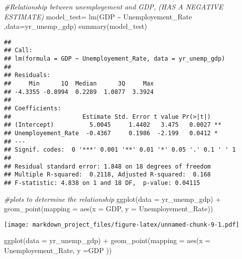 \documentclass[
]{article}
\newenvironment{Shaded}{\begin{snugshade}}{\end{snugshade}}
\newcommand{\AttributeTok}[1]{\textcolor[rgb]{0.77,0.63,0.00}{#1}}
\newcommand{\CommentTok}[1]{\textcolor[rgb]{0.56,0.35,0.01}{\textit{#1}}}
\newcommand{\FunctionTok}[1]{\textcolor[rgb]{0.00,0.00,0.00}{#1}}
\newcommand{\NormalTok}[1]{#1}
\newcommand{\OtherTok}[1]{\textcolor[rgb]{0.56,0.35,0.01}{#1}}
\newcommand{\SpecialCharTok}[1]{\textcolor[rgb]{0.00,0.00,0.00}{#1}}
\begin{document}
\begin{Shaded}
\begin{Highlighting}[]
\CommentTok{\#Relationship between unemployement and GDP, (HAS A NEGATIVE ESTIMATE)}
\NormalTok{model\_test}\OtherTok{=} \FunctionTok{lm}\NormalTok{(GDP }\SpecialCharTok{\textasciitilde{}}\NormalTok{ Unemployement\_Rate ,}\AttributeTok{data=}\NormalTok{yr\_unemp\_gdp)}
\FunctionTok{summary}\NormalTok{(model\_test)}
\end{Highlighting}
\end{Shaded}

\begin{verbatim}
## 
## Call:
## lm(formula = GDP ~ Unemployement_Rate, data = yr_unemp_gdp)
## 
## Residuals:
##     Min      1Q  Median      3Q     Max 
## -4.3355 -0.8994  0.2289  1.0877  3.3924 
## 
## Coefficients:
##                    Estimate Std. Error t value Pr(>|t|)   
## (Intercept)          5.0045     1.4402   3.475   0.0027 **
## Unemployement_Rate  -0.4367     0.1986  -2.199   0.0412 * 
## ---
## Signif. codes:  0 '***' 0.001 '**' 0.01 '*' 0.05 '.' 0.1 ' ' 1
## 
## Residual standard error: 1.848 on 18 degrees of freedom
## Multiple R-squared:  0.2118, Adjusted R-squared:  0.168 
## F-statistic: 4.838 on 1 and 18 DF,  p-value: 0.04115
\end{verbatim}

\begin{Shaded}
\begin{Highlighting}[]
\CommentTok{\#plots to determine the relationship}
\FunctionTok{ggplot}\NormalTok{(}\AttributeTok{data =}\NormalTok{ yr\_unemp\_gdp) }\SpecialCharTok{+}
  \FunctionTok{geom\_point}\NormalTok{(}\AttributeTok{mapping =} \FunctionTok{aes}\NormalTok{(}\AttributeTok{x =}\NormalTok{ GDP, }\AttributeTok{y =}\NormalTok{ Unemployement\_Rate))}
\end{Highlighting}
\end{Shaded}

\texttt{[image: markdown\_project\_files/figure-latex/unnamed-chunk-9-1.pdf]}

\begin{Shaded}
\begin{Highlighting}[]
\FunctionTok{ggplot}\NormalTok{(}\AttributeTok{data =}\NormalTok{ yr\_unemp\_gdp) }\SpecialCharTok{+}
  \FunctionTok{geom\_point}\NormalTok{(}\AttributeTok{mapping =} \FunctionTok{aes}\NormalTok{(}\AttributeTok{x =}\NormalTok{ Unemployement\_Rate, }\AttributeTok{y =}\NormalTok{GDP ))}
\end{Highlighting}
\end{Shaded}
\end{document}
